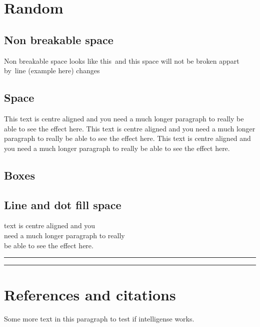\documentclass[16pt,a4paper]{article}
\begin{document}
\section{Random}
\subsection{Non breakable space}

Non breakable space looks like this~and this space will not be broken appart by~line (example here) changes
\subsection{Space}
This text is centre \hspace{10mm} aligned and you need a much longer paragraph to really be able to see the effect here.
This text is centre aligned and you need a much longer paragraph to really be able to see the effect here.\vspace{2cm}
This text is centre aligned and you need a much longer paragraph to really be able to see the effect here.
\subsection{Boxes}

\subsection{Line and dot fill space}
text is centre aligned and you \hrulefill\\need a much longer paragraph to really \\be able to see the effect here.\\
\rule{\linewidth}{1mm}
\begin{center}
    \rule{3cm}{2mm}
\end{center}

\section{References and citations}
\cite{sane_brief_2021}
Some more text in this paragraph to test if intelligense works. \cite{}


\end{document}
